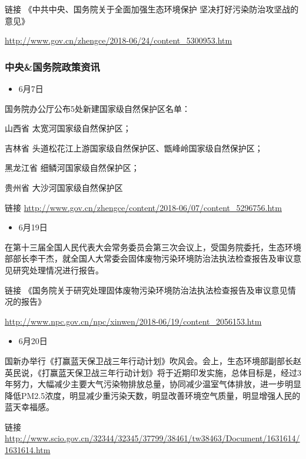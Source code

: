 \documentclass[]{book}
\providecommand{\tightlist}{%
  \setlength{\itemsep}{0pt}\setlength{\parskip}{0pt}}
\begin{document}
链接 《中共中央、国务院关于全面加强生态环境保护
坚决打好污染防治攻坚战的意见》

\url{http://www.gov.cn/zhengce/2018-06/24/content_5300953.htm}

\subsubsection*{中央\&国务院政策资讯}\label{-2}

\begin{itemize}
\tightlist
\item
  6月7日
\end{itemize}

国务院办公厅公布5处新建国家级自然保护区名单：

山西省 太宽河国家级自然保护区；

吉林省 头道松花江上游国家级自然保护区、甑峰岭国家级自然保护区；

黑龙江省 细鳞河国家级自然保护区；

贵州省 大沙河国家级自然保护区

链接
\url{http://www.gov.cn/zhengce/content/2018-06/07/content_5296756.htm}

\begin{itemize}
\tightlist
\item
  6月19日
\end{itemize}

在第十三届全国人民代表大会常务委员会第三次会议上，受国务院委托，生态环境部部长李干杰，就全国人大常委会固体废物污染环境防治法执法检查报告及审议意见研究处理情况进行报告。

链接
《国务院关于研究处理固体废物污染环境防治法执法检查报告及审议意见情况的报告》

\url{http://www.npc.gov.cn/npc/xinwen/2018-06/19/content_2056153.htm}

\begin{itemize}
\tightlist
\item
  6月20日
\end{itemize}

国新办举行《打赢蓝天保卫战三年行动计划》吹风会。会上，生态环境部副部长赵英民说，《打赢蓝天保卫战三年行动计划》将于近期印发实施，总体目标是，经过3年努力，大幅减少主要大气污染物排放总量，协同减少温室气体排放，进一步明显降低PM2.5浓度，明显减少重污染天数，明显改善环境空气质量，明显增强人民的蓝天幸福感。

链接
\url{http://www.scio.gov.cn/32344/32345/37799/38461/tw38463/Document/1631614/1631614.htm}
\end{document}
